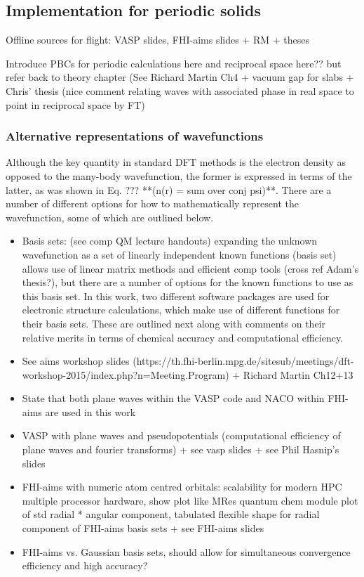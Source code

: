 \documentclass[11pt, twoside]{report}
\begin{document}
\subsection{Implementation for periodic solids}
Offline sources for flight: VASP slides, FHI-aims slides + RM + theses

Introduce PBCs for periodic calculations here and reciprocal space here?? but refer back to theory chapter (See Richard Martin Ch4 \cite{RichardMartin_Ch4} + vacuum gap for slabs + Chris' thesis (nice comment relating waves with associated phase in real space to point in reciprocal space by FT)

\subsubsection{Alternative representations of wavefunctions}
Although the key quantity in standard DFT methods is the electron density as opposed to the many-body wavefunction, the former is expressed in terms of the latter, as was shown in Eq. ??? **(n(r) = sum over conj psi)**. There are a number of different options for how to mathematically represent the wavefunction, some of which are outlined below.
\begin{itemize}
\item Basis sets: (see comp QM lecture handouts) expanding the unknown wavefunction as a set of linearly independent known functions (basis set) allows use of linear matrix methods and efficient comp tools (cross ref Adam's thesis?), but there are a number of options for the known functions to use as this basis set. In this work, two different software packages are used for electronic structure calculations, which make use of different functions for their basis sets. These are outlined next along with comments on their relative merits in terms of chemical accuracy and computational efficiency.
\item See aims workshop slides (https://th.fhi-berlin.mpg.de/sitesub/meetings/dft-workshop-2015/index.php?n=Meeting.Program) + Richard Martin Ch12+13 \cite{RichardMartin_Ch12} \cite{RichardMartin_Ch13}
\item State that both plane waves within the VASP code and NACO within FHI-aims are used in this work
\item VASP with plane waves and pseudopotentials (computational efficiency of plane waves and fourier transforms) \cite{RichardMartin_Ch11} + see vasp slides + see Phil Hasnip's slides
\item FHI-aims with numeric atom centred orbitals: scalability for modern HPC multiple processor hardware, show plot like MRes quantum chem module plot of std radial * angular component, tabulated flexible shape for radial component of FHI-aims basis sets + see FHI-aims slides
\item FHI-aims vs. Gaussian basis sets, should allow for simultaneous convergence efficiency and high accuracy?
\end{itemize}
\end{document}

